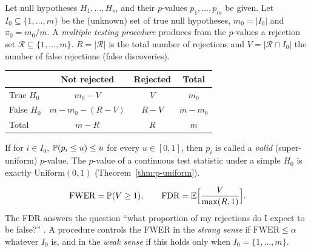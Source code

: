 \documentclass[main.tex]{subfiles}
\begin{document}
\begin{definition}\label{def:coklu-test}
Let null hypotheses $H_1,\dots,H_m$ and their $p$-values $p_1,\dots,p_m$ be given. Let $I_0\subseteq\{1,\dots,m\}$ be the (unknown) set of true null hypotheses, $m_0=|I_0|$ and $\pi_0=m_0/m$. A \emph{multiple testing procedure} produces from the $p$-values a rejection set $\mathcal R\subseteq\{1,\dots,m\}$. $R=|\mathcal R|$ is the total number of rejections and $V=|\mathcal R\cap I_0|$ the number of false rejections (false discoveries).
\begin{center}
\begin{tabular}{lccc}
\toprule
 & Not rejected & Rejected & Total\\
\midrule
True $H_0$ & $m_0-V$ & $V$ & $m_0$\\
False $H_0$ & $m-m_0-(R-V)$ & $R-V$ & $m-m_0$\\
\midrule
Total & $m-R$ & $R$ & $m$\\
\bottomrule
\end{tabular}
\end{center}
\end{definition}

\begin{definition}\label{def:gecerli-p}
If for $i\in I_0$, $\P(p_i\le u)\le u$ for every $u\in[0,1]$, then $p_i$ is called a \emph{valid} (super-uniform) $p$-value. The $p$-value of a continuous test statistic under a simple $H_0$ is exactly $\text{Uniform}(0,1)$ (Theorem~\ref{thm:p-uniform}).
\end{definition}

\begin{definition}\label{def:fwer-fdr}
\[
\mathrm{FWER}=\P(V\ge1),\qquad\mathrm{FDR}=\E\Big[\frac{V}{\max(R,1)}\Big].
\]
The FDR answers the question ``what proportion of my rejections do I expect to be false?'' \cite{benjamini-hochberg95}. A procedure controls the FWER in the \emph{strong sense} if $\mathrm{FWER}\le\alpha$ whatever $I_0$ is, and in the \emph{weak sense} if this holds only when $I_0=\{1,\dots,m\}$.
\end{definition}
\end{document}
